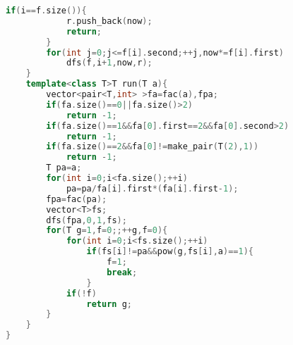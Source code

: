 \documentclass{book}
\begin{document}
\begin{lstlisting}[language=C++,title={Primitive Root.hpp (3256 bytes, 106 lines)}]
        if(i==f.size()){
            r.push_back(now);
            return;
        }
        for(int j=0;j<=f[i].second;++j,now*=f[i].first)
            dfs(f,i+1,now,r);
    }
    template<class T>T run(T a){
        vector<pair<T,int> >fa=fac(a),fpa;
        if(fa.size()==0||fa.size()>2)
            return -1;
        if(fa.size()==1&&fa[0].first==2&&fa[0].second>2)
            return -1;
        if(fa.size()==2&&fa[0]!=make_pair(T(2),1))
            return -1;
        T pa=a;
        for(int i=0;i<fa.size();++i)
            pa=pa/fa[i].first*(fa[i].first-1);
        fpa=fac(pa);
        vector<T>fs;
        dfs(fpa,0,1,fs);
        for(T g=1,f=0;;++g,f=0){
            for(int i=0;i<fs.size();++i)
                if(fs[i]!=pa&&pow(g,fs[i],a)==1){
                    f=1;
                    break;
                }
            if(!f)
                return g;
        }
    }
}
\end{lstlisting}
\end{document}
